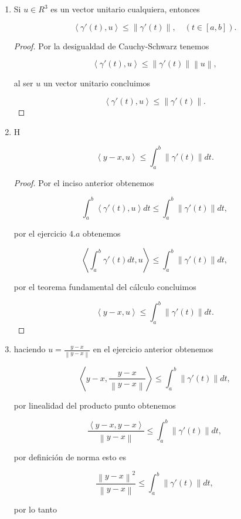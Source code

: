 \documentclass[letterpaper]{article}
\theoremstyle{definition}
\theoremstyle{lemathm}
\theoremstyle{lemathm}
\theoremstyle{lemademthm}
\newcommand{\bracs}[1]{\left[ #1 \right] }
\newcommand{\inprod}[1]{\left\langle #1 \right\rangle }
\newcommand{\norm}[1]{\left\lVert#1\right\rVert}
\newcommand{\1}{\mathbbm{1}}
\begin{document}
\begin{enumerate}
		\begin{enumerate}
			\item Si $u \in R^3$ es un vector unitario cualquiera, entonces
			
			\[\inprod{\gamma'(t),u}\leq\norm{\gamma'(t)}, \quad (t\in\bracs{a,b}).\]

			\begin{proof}
				Por la desigualdad de Cauchy-Schwarz tenemos

				\[\inprod{\gamma'(t),u}\leq\norm{\gamma'(t)}\norm{u},\]

				al ser $u$ un vector unitario concluimos

				\[\inprod{\gamma'(t),u}\leq\norm{\gamma'(t)}.\]
				
			\end{proof}

			\item H
			
			\[\inprod{y-x, u} \leq \int_{a}^{b} \norm{\gamma'(t)}dt.\]

			\begin{proof}
				
				Por el inciso anterior obtenemos

				\[\int_{a}^{b}\inprod{\gamma'(t),u} dt \leq \int_{a}^{b}\norm{\gamma'(t)} dt,\]

				por el ejercicio $4.a$ obtenemos

				\[\inprod{\int_{a}^{b}\gamma'(t) dt,u} \leq \int_{a}^{b}\norm{\gamma'(t)} dt,\]

				por el teorema fundamental del cálculo concluimos

				\[\inprod{y-x,u} \leq \int_{a}^{b}\norm{\gamma'(t)} dt.\]

			\end{proof}

			\item haciendo $u = \frac{y-x}{\norm{y-x}}$ en el ejercicio anterior obtenemos
			
			\[\inprod{y-x,\frac{y-x}{\norm{y-x}}} \leq \int_{a}^{b}\norm{\gamma'(t)} dt,\]

			por linealidad del producto punto obtenemos

			\[\frac{\inprod{y-x,y-x}}{\norm{y-x}} \leq \int_{a}^{b}\norm{\gamma'(t)} dt,\]

			por definición de norma esto es

			\[\frac{\norm{y-x}^2}{\norm{y-x}} \leq \int_{a}^{b}\norm{\gamma'(t)} dt,\]

			por lo tanto


\end{enumerate}
\end{enumerate}
\end{document}
